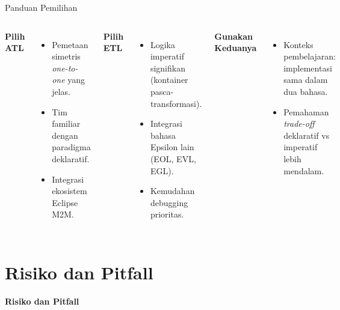 \documentclass[aspectratio=169, table]{beamer}
\begin{document}
\begin{frame}{Panduan Pemilihan}
\vspace{6pt}
\begin{columns}[T]
\textbf{Pilih ATL}
\begin{itemize}
  \item Pemetaan simetris \textit{one-to-one} yang jelas.
  \item Tim familiar dengan paradigma deklaratif.
  \item Integrasi ekosistem Eclipse M2M.
\end{itemize}

\textbf{Pilih ETL}
\begin{itemize}
  \item Logika imperatif signifikan (kontainer pasca-transformasi).
  \item Integrasi bahasa Epsilon lain (EOL, EVL, EGL).
  \item Kemudahan debugging prioritas.
\end{itemize}

\textbf{Gunakan Keduanya}
\begin{itemize}
  \item Konteks pembelajaran: implementasi sama dalam dua bahasa.
  \item Pemahaman \textit{trade-off} deklaratif vs imperatif lebih mendalam.
\end{itemize}
\end{columns}
\end{frame}

\section{Risiko dan Pitfall}
\begin{frame}{\hfill}
	\centering
	\Huge{\textbf{Risiko dan Pitfall}}
\end{frame}
\end{document}
